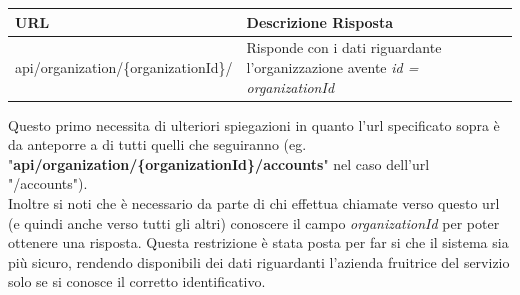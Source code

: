 	\begin{small}
		\begin{longtable}{ | l | p{8cm} | }
			\hline \textbf{URL} & \textbf{Descrizione Risposta}\\
			\hline api/organization/\{organizationId\}/ & Risponde con i dati riguardante l'organizzazione avente \textit{id = organizationId}\\
			\hline
		\end{longtable}		
	\end{small}
Questo primo  necessita di ulteriori spiegazioni in quanto l'url specificato sopra è da anteporre a di tutti quelli che seguiranno (eg. "\textbf{api/organization/\{organizationId\}/accounts}" nel caso dell'url "/accounts").\\
Inoltre si noti che è necessario da parte di chi effettua chiamate verso questo url (e quindi anche verso tutti gli altri) conoscere il campo \textit{organizationId} per poter ottenere una risposta. Questa restrizione è stata posta per far si che il sistema sia più sicuro, rendendo disponibili dei dati riguardanti l'azienda fruitrice del servizio solo se si conosce il corretto identificativo.
